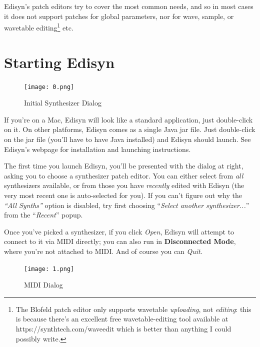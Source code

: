 \documentclass{article}
\newcommand\bump{\vspace{12in}}
\begin{document}
Edisyn's patch editors try to cover the most common needs, and so in most cases it does not support patches for global parameters, nor for wave, sample, or wavetable editing\footnote{The Blofeld patch editor only supports wavetable {\it uploading}, not {\it editing}: this is because there's an excellent free wavetable-editing tool available at https:/\!/synthtech.com/waveedit which is better than anything I could possibly write.} etc.  


\bump

\section{Starting Edisyn}
\label{startingedisyn}

\begin{figure}
\vspace{-2em}\texttt{[image: 0.png]}
\vspace{-3em}\caption{Initial Synthesizer Dialog}\label{initialsynthpanel}
\end{figure}

If you're on a Mac, Edisyn will look like a standard application, just double-click on it.  On other platforms, Edisyn comes as a single Java jar file.  Just double-click on the jar file (you'll have to have Java installed) and Edisyn should launch.  See Edisyn's webpage for installation and launching instructions.

The first time you launch Edisyn, you'll be presented with the dialog at right, asking you to choose a synthesizer patch editor.  You can either select from {\it all} synthesizers available, or from those you have {\it recently} edited with Edisyn (the very most recent one is auto-selected for you). If you can't figure out why the {\it ``All Synths''} option is disabled, try first choosing ``{\it Select another synthesizer...}'' from the ``{\it Recent}'' popup.  

Once you've picked a synthesizer, if you click {\it Open}, Edisyn will attempt to connect to it via MIDI directly; you can also run in {\bf Disconnected Mode}, where you're not attached to MIDI.  And of course you can {\it Quit}.

\begin{figure}
\texttt{[image: 1.png]}
\vspace{-1em}\caption{MIDI Dialog}\label{mididialog}
\vspace{-3em}
\end{figure}
\end{document}
